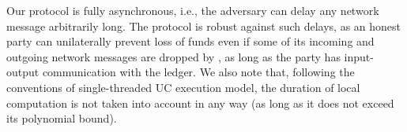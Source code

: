   Our protocol is fully asynchronous, i.e., the adversary can delay any network
  message arbitrarily long. The protocol is robust against such delays, as an
  honest party can unilaterally prevent loss of funds even if some of its
  incoming and outgoing network messages are dropped by \adversary, as long as
  the party has input-output communication with the ledger. We also note that,
  following the conventions of single-threaded UC execution model, the duration of local
  computation is not taken into account in any way (as long as it does not
  exceed its polynomial bound).
